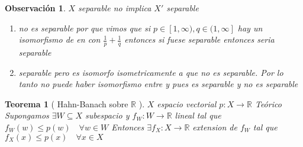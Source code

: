\documentclass[10pt]{extarticle}
\theoremstyle{break}
\newtheorem{theorem}{Teorema}[section]
\newtheorem*{remark}{Observación}
\theoremstyle{definition}
\begin{document}
\begin{remark} $X$ separable no implica $X'$ separable
\begin{enumerate}
\item no es separable por que vimos que si $p \in [1,\infty),q \in (1,\infty]$ hay un isomorfismo de en con $\frac{1}{p}+\frac{1}{q}$ entonces si fuese separable entonces seria separable
\item separable pero es isomorfo isometricamente a que no es separable. Por lo tanto no puede haber isomorfismo entre y pues es separable y no es separable
\end{enumerate}
\end{remark}

\begin{theorem} [ Hahn-Banach sobre $\mathbb{R}$ ]
$X$ espacio vectorial $p : X\rightarrow \mathbb{R}$ Teórico Supongamos $\exists W\subseteq X$ subespacio y $f_{W}:W\rightarrow\mathbb{R}$ lineal tal que $f_{W}(w)\leq p(w)\quad\forall w\in W$
Entonces $\exists f_{X}:X\rightarrow\mathbb{R}$ extension de $f_{W}$ tal que $f_{X}(x)\leq p(x)\quad\forall x\in X$
\end{theorem}
\end{document}
